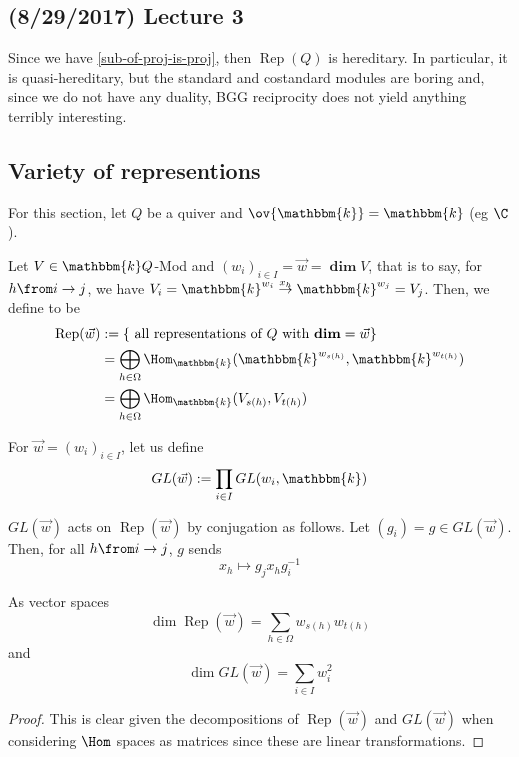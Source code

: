 \documentclass[11pt,leqno,oneside]{amsbook}
\numberwithin{thm}{section}
\newcommand{\bbk}{\mathbbm{k}} %
\newcommand{\Rep}{\operatorname{Rep}} %
\renewcommand{\Q}{Q} %
\newcommand{\grdim}{\boldsymbol{\dim}} %
\begin{document}
\subsection*{(8/29/2017) Lecture 3}
Since we have \ref{sub-of-proj-is-proj}, then \(\Rep(\Q)\) is
hereditary. In particular, it is quasi-hereditary, but the standard
and costandard modules are boring and, since we do not have any
duality, BGG reciprocity does not yield anything terribly interesting.
\subsection{Variety of representions}
For this section, let \(\Q\) be a quiver and \(\ov{\bbk} = \bbk\) (eg
\(\C\)).
\begin{defn}
  Let \(V \in \bbk\Q\)-Mod and \((w_i)_{i \in I} = \vec{w} = \grdim
  V\), that is to say, for \(h \from i \to j\), we have \(V_i =
  \bbk^{w_i} \overset{x_h}{\to} \bbk^{w_j} = V_j\). Then, we define
   to be
  \begin{align*}
    \Rep(\vec{w})
    & := \{\text{ all representations of }\Q \text{ with
      }\grdim = \vec{w}\} \\
    & = \bigoplus_{h \in \Omega} \Hom_\bbk (\bbk^{w_{s(h)}},
      \bbk^{w_{t(h)}}) \\
    & = \bigoplus_{h \in \Omega} \Hom_\bbk (V_{s(h)}, V_{t(h)})
  \end{align*}
\end{defn}
\begin{defn}
  For \(\vec{w} = (w_i)_{i \in I}\), let us define \[
    GL(\vec{w}) := \prod_{i \in I} GL(w_i, \bbk)
  \]
\end{defn}
\begin{prop}
  \(GL(\vec{w})\) acts on \(\Rep(\vec{w})\) by conjugation as
  follows. Let \((g_i) = g \in GL(\vec{w})\). Then, for all \(h \from
  i \to j\), \(g\) sends \[
    x_h \mapsto g_j x_h g_i^{-1}
  \]
\end{prop}
\begin{prop} \label{dim-of-rep-and-GL}
  As vector spaces \[
    \dim \Rep(\vec{w}) = \sum_{h \in \Omega} w_{s(h)} w_{t(h)}
  \]
  and \[
    \dim GL(\vec{w}) = \sum_{i \in I} w_i^2
  \]
\end{prop}
\begin{proof}
  This is clear given the decompositions of \(\Rep(\vec{w})\) and
  \(GL(\vec{w})\) when considering \(\Hom\) spaces as matrices since
  these are linear transformations.
\end{proof}
\end{document}

